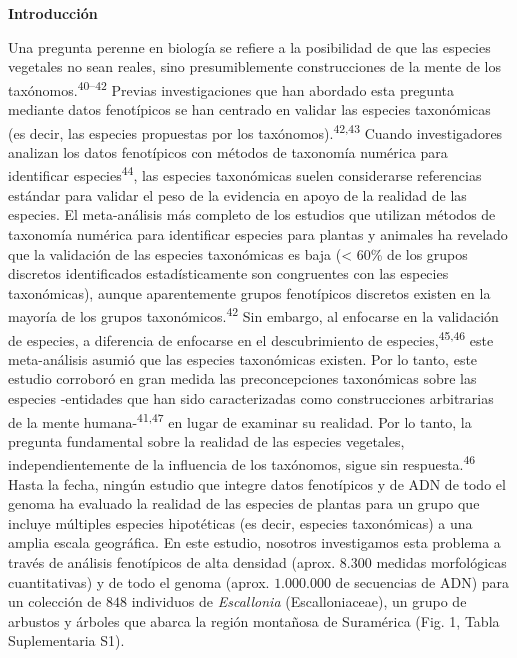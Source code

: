 \documentclass[
  11pt,
]{article}
\begin{document}
\textbf{Introducción}

Una pregunta perenne en biología se refiere a la posibilidad de que las especies vegetales no sean reales, sino presumiblemente construcciones de la mente de los taxónomos.\textsuperscript{40--42} Previas investigaciones que han abordado esta pregunta mediante datos fenotípicos se han centrado en validar las especies taxonómicas (es decir, las especies propuestas por los taxónomos).\textsuperscript{42,43} Cuando investigadores analizan los datos fenotípicos con métodos de taxonomía numérica para identificar especies\textsuperscript{44}, las especies taxonómicas suelen considerarse referencias estándar para validar el peso de la evidencia en apoyo de la realidad de las especies. El meta-análisis más completo de los estudios que utilizan métodos de taxonomía numérica para identificar especies para plantas y animales ha revelado que la validación de las especies taxonómicas es baja (\textless{} 60\% de los grupos discretos identificados estadísticamente son congruentes con las especies taxonómicas), aunque aparentemente grupos fenotípicos discretos existen en la mayoría de los grupos taxonómicos.\textsuperscript{42} Sin embargo, al enfocarse en la validación de especies, a diferencia de enfocarse en el descubrimiento de especies,\textsuperscript{45,46} este meta-análisis asumió que las especies taxonómicas existen. Por lo tanto, este estudio corroboró en gran medida las preconcepciones taxonómicas sobre las especies -entidades que han sido caracterizadas como construcciones arbitrarias de la mente humana-\textsuperscript{41,47} en lugar de examinar su realidad. Por lo tanto, la pregunta fundamental sobre la realidad de las especies vegetales, independientemente de la influencia de los taxónomos, sigue sin respuesta.\textsuperscript{46} Hasta la fecha, ningún estudio que integre datos fenotípicos y de ADN de todo el genoma ha evaluado la realidad de las especies de plantas para un grupo que incluye múltiples especies hipotéticas (es decir, especies taxonómicas) a una amplia escala geográfica. En este estudio, nosotros investigamos esta problema a través de análisis fenotípicos de alta densidad (aprox. \(8.300\) medidas morfológicas cuantitativas) y de todo el genoma (aprox. \(1.000.000\) de secuencias de ADN) para un colección de \(848\) individuos de \emph{Escallonia} (Escalloniaceae), un grupo de arbustos y árboles que abarca la región montañosa de Suramérica (Fig. 1, Tabla Suplementaria S1).
\end{document}
